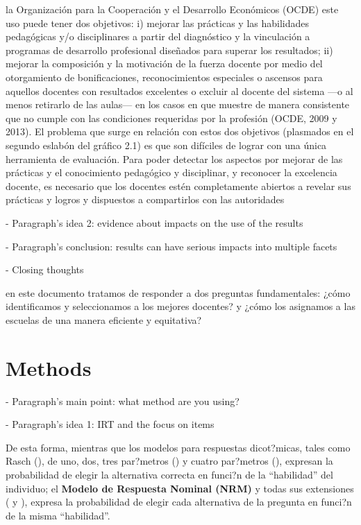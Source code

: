 la Organización para la Cooperación y el Desarrollo Económicos (OCDE) este uso puede tener dos objetivos: i) mejorar las prácticas y las habilidades pedagógicas y/o disciplinares a partir del diagnóstico y la vinculación a programas de desarrollo profesional diseñados para superar los resultados; ii) mejorar la composición y la motivación de la fuerza docente por medio del otorgamiento de bonificaciones, reconocimientos especiales o ascensos para aquellos docentes con resultados excelentes o excluir al docente del sistema —o al menos retirarlo de las aulas— en los casos en que muestre de manera consistente que no cumple con las condiciones requeridas por la profesión (OCDE, 2009 y 2013).
El problema que surge en relación con estos dos objetivos (plasmados en el segundo eslabón del gráfico 2.1) es que son difíciles de lograr con una única herramienta de evaluación.
Para poder detectar los aspectos por mejorar de las prácticas y el conocimiento pedagógico y disciplinar, y reconocer la excelencia docente, es necesario que los docentes estén completamente abiertos a revelar sus prácticas y logros y dispuestos a compartirlos con las autoridades \citep{Hincapie_et_al_2020}


- Paragraph's idea 2: evidence about impacts on the use of the results


- Paragraph's conclusion: results can have serious impacts into multiple facets




- Closing thoughts

en este documento tratamos de responder a dos preguntas fundamentales: ¿cómo identificamos y seleccionamos a los mejores docentes? y ¿cómo los asignamos a las escuelas de una manera eficiente y equitativa? \citep{Bertoni_et_al_2020b}



\section{Methods}

- Paragraph's main point: what method are you using?


- Paragraph's idea 1: IRT and the focus on items

De esta forma, mientras que los modelos para respuestas dicot?micas, tales como Rasch (\citealp{Rasch1980}), de uno, dos, tres par?metros (\citealp{Lord_Nov2008}) y cuatro par?metros (\citealp{McDonald1967}), expresan la probabilidad de elegir la alternativa correcta en funci?n de la ``habilidad'' del individuo; el \textbf{Modelo de Respuesta Nominal (NRM)} y todas sus extensiones (\citealt{Bock1972}  y \citealt[cap?tulo 2]{Linden1997}), expresa la probabilidad de elegir cada alternativa de la pregunta en funci?n de la misma ``habilidad''.

